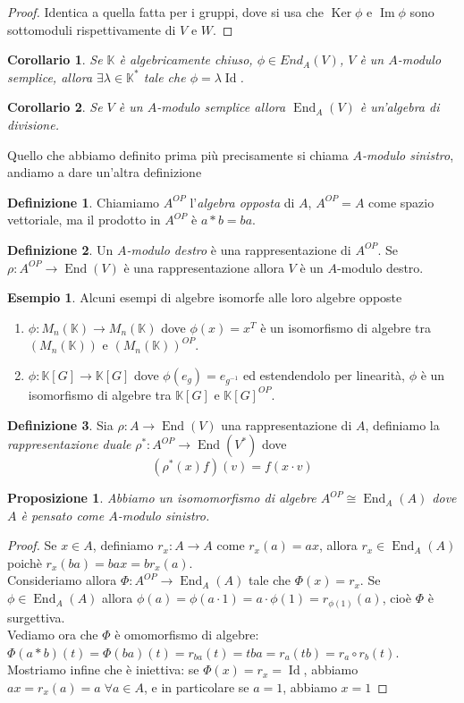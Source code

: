 \documentclass[11pt]{article}
\theoremstyle{plain}
\newtheorem{prop}[thm]{Proposizione}
\newtheorem*{cor}{Corollario}
\theoremstyle{definition}
\newtheorem{defn}{Definizione}[section]
\newtheorem{exmp}{Esempio}[section]
\theoremstyle{remark}
\newcommand{\K}{\mathbb{K}}
\DeclareMathOperator{\End}{End}
\DeclareMathOperator{\Ker}{Ker}
\DeclareMathOperator{\Imm}{Im}
\DeclareMathOperator{\Id}{Id}
\begin{document}
	\begin{proof}
		Identica a quella fatta per i gruppi, dove si usa che $\Ker \phi$ e $\Imm \phi$ sono sottomoduli rispettivamente di $V$ e $W$.
	\end{proof}
	\begin{cor}
		Se $\K$ è algebricamente chiuso, $\phi\in End_A(V)$, $V$ è un $A$-modulo semplice, allora $\exists \lambda \in \K^*$ tale che $\phi = \lambda \Id$.
	\end{cor}
	\begin{cor}
		Se $V$ è un $A$-modulo semplice allora $\End_A(V)$ è un'algebra di divisione.
	\end{cor}
	Quello che abbiamo definito prima più precisamente si chiama \textit{$A$-modulo sinistro}, andiamo a dare un'altra definizione
	\begin{defn}
		Chiamiamo $A^{OP}$ l'\textit{algebra opposta} di $A$, $A^{OP}=A$ come spazio vettoriale, ma il prodotto in $A^{OP}$ è $a*b = ba$.
	\end{defn}
	\begin{defn}
		Un \textit{$A$-modulo destro} è una rappresentazione di $A^{OP}$. Se $\rho:A^{OP}\to \End(V)$ è una rappresentazione allora $V$ è un $A$-modulo destro.
	\end{defn}
	\begin{exmp}
		Alcuni esempi di algebre isomorfe alle loro algebre opposte
		\begin{enumerate}
			\item $\phi:M_n(\K) \to M_n(\K)$ dove $\phi(x)= x^T$ è un isomorfismo di algebre tra $\left(M_n(\K) \right)$ e $\left( M_n(\K) \right)^{OP}$.
			\item $\phi:\K[G]\to \K[G]$ dove $\phi(e_g)=e_{g^{-1}}$ ed estendendolo per linearità, $\phi$ è un isomorfismo di algebre tra $\K[G]$ e $\K[G]^{OP}$.
		\end{enumerate}
	\end{exmp}
	\begin{defn} Sia $\rho:A\to \End(V)$ una rappresentazione di $A$, definiamo la \textit{rappresentazione duale} $\rho^*:A^{OP}\to \End(V^*)$ dove
	\[
		(\rho^*(x)f)(v) = f(x\cdot v)
	\]
	\end{defn}
	\begin{prop}
		Abbiamo un isomomorfismo di algebre $A^{OP}\cong \End_A(A)$ dove $A$ è pensato come $A$-modulo sinistro.
	\end{prop}
	\begin{proof}
		Se $x\in A$, definiamo $r_x:A\to A$ come $r_x(a)=ax$, allora $r_x\in \End_A(A)$ poichè $r_x(ba)=bax = br_x(a)$.\\
		Consideriamo allora $\Phi:A^{OP}\to\End_A(A)$ tale che $\Phi(x)=r_x$. Se $\phi\in \End_A(A)$ allora $\phi(a)=\phi(a\cdot1)=a\cdot\phi(1) = r_{\phi(1)}(a)$, cioè $\Phi$ è surgettiva.\\
		Vediamo ora che $\Phi$  è omomorfismo di algebre: $\Phi(a\ast b)(t)=\Phi(ba)(t)=r_{ba}(t)=tba=r_a(tb)=r_a\circ r_b (t)$.\\
		Mostriamo infine che è iniettiva: se $\Phi(x)=r_x=\Id$, abbiamo $ax=r_x(a)=a\;\forall a\in A$, e in particolare se $a=1$, abbiamo $x=1$
	\end{proof}
\end{document}
